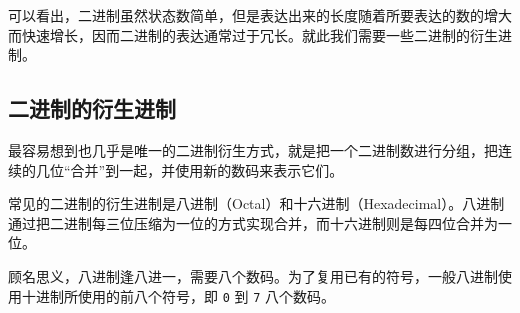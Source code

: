         可以看出，二进制虽然状态数简单，但是表达出来的长度随着所要表达的数的增大而快速增长，因而二进制的表达通常过于冗长。就此我们需要一些二进制的衍生进制。

    \subsection{二进制的衍生进制}\label{subsec:NumberSystemBasics/PositionalNotation/BinaryDerivation}
        最容易想到也几乎是唯一的二进制衍生方式，就是把一个二进制数进行分组，把连续的几位“合并”到一起，并使用新的数码来表示它们。

        常见的二进制的衍生进制是八进制（Octal）和十六进制（Hexadecimal）。八进制通过把二进制每三位压缩为一位的方式实现合并，而十六进制则是每四位合并为一位。

        顾名思义，八进制逢八进一，需要八个数码。为了复用已有的符号，一般八进制使用十进制所使用的前八个符号，即 \texttt{0} 到 \texttt{7} 八个数码。

